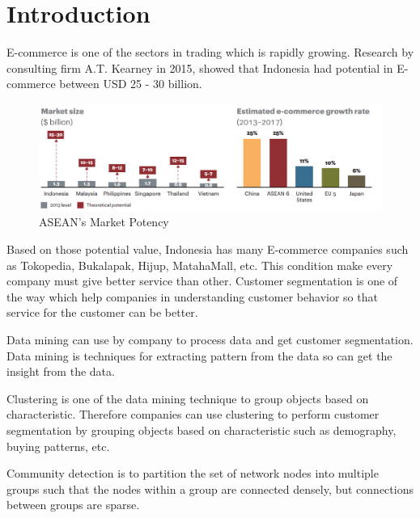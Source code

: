 \documentclass[conference]{IEEEtran}
\begin{document}
%
\IEEEpeerreviewmaketitle



\section{Introduction}
E-commerce is one of the sectors in trading which is rapidly growing. Research by consulting firm A.T. Kearney in 2015, showed that Indonesia had potential in E-commerce between USD
25 - 30 billion.

\begin{figure}[h]
\centering
\includegraphics[width=\columnwidth]{figure/marketpotency}
\caption{ASEAN's Market Potency}
\label{market_potency}
\end{figure}

Based on those potential value, Indonesia has many E-commerce companies such as Tokopedia, Bukalapak, Hijup, MatahaMall, etc. This condition make every company must give better service than other. Customer segmentation is one of the way which help companies in understanding customer behavior so that service for the customer can be better.

Data mining can use by company to process data and get customer segmentation. Data mining is techniques for extracting pattern from the data so can get the insight from the data.

Clustering is one of the data mining technique to group objects based on characteristic. Therefore companies can use clustering to perform customer segmentation by grouping objects based on characteristic such as demography, buying patterns, etc.

Community detection is to partition the set of network nodes into multiple groups such that the nodes within a group are connected densely, but connections between groups are sparse.
\end{document}
